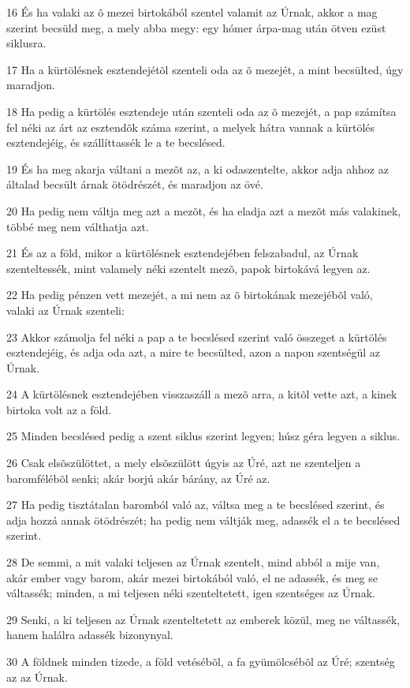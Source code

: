 \par 16 És ha valaki az õ mezei birtokából szentel valamit az Úrnak, akkor a mag szerint becsüld meg, a mely abba megy: egy hómer árpa-mag után ötven ezüst siklusra.
\par 17 Ha a kürtölésnek esztendejétõl szenteli oda az õ mezejét, a mint becsülted, úgy maradjon.
\par 18 Ha pedig a kürtölés esztendeje után szenteli oda az õ mezejét, a pap számítsa fel néki az árt az esztendõk száma szerint, a melyek hátra vannak a kürtölés esztendejéig, és szállíttassék le a te becslésed.
\par 19 És ha meg akarja váltani a mezõt az, a ki odaszentelte, akkor adja ahhoz az általad becsült árnak ötödrészét, és maradjon az övé.
\par 20 Ha pedig nem váltja meg azt a mezõt, és ha eladja azt a mezõt más valakinek, többé meg nem válthatja azt.
\par 21 És az a föld, mikor a kürtölésnek esztendejében felszabadul, az Úrnak szenteltessék, mint valamely néki szentelt mezõ, papok birtokává legyen az.
\par 22 Ha pedig pénzen vett mezejét, a mi nem az õ birtokának mezejébõl való, valaki az Úrnak szenteli:
\par 23 Akkor számolja fel néki a pap a te becslésed szerint való összeget a kürtölés esztendejéig, és adja oda azt, a mire te becsülted, azon a napon szentségül az Úrnak.
\par 24 A kürtölésnek esztendejében visszaszáll a mezõ arra, a kitõl vette azt, a kinek birtoka volt az a föld.
\par 25 Minden becslésed pedig a szent siklus szerint legyen; húsz géra legyen a siklus.
\par 26 Csak elsõszülöttet, a mely elsõszülött úgyis az Úré, azt ne szenteljen a baromfélébõl senki; akár borjú akár bárány, az Úré az.
\par 27 Ha pedig tisztátalan baromból való az, váltsa meg a te becslésed szerint, és adja hozzá annak ötödrészét; ha pedig nem váltják meg, adassék el a te becslésed szerint.
\par 28 De semmi, a mit valaki teljesen az Úrnak szentelt, mind abból a mije van, akár ember vagy barom, akár mezei birtokából való, el ne adassék, és meg se váltassék; minden, a mi teljesen néki szenteltetett, igen szentséges az Úrnak.
\par 29 Senki, a ki teljesen az Úrnak szenteltetett az emberek közül, meg ne váltassék, hanem halálra adassék bizonynyal.
\par 30 A földnek minden tizede, a föld vetésébõl, a fa gyümölcsébõl az Úré; szentség az az Úrnak.
